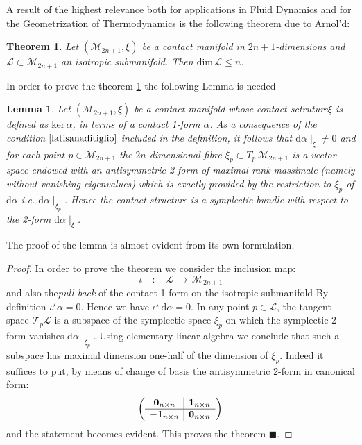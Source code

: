 \documentclass[10pt,a4paper]{article}
\newtheorem{teorema}{Theorem}[section]
\newtheorem{lemma}{Lemma}[section]
\newtheorem{proof}{Proof}[section]
\begin{document}
A result of the highest relevance both for applications in Fluid Dynamics and for the Geometrization of Thermodynamics
is the following theorem due to  Arnol'd:
\begin{teorema}
\label{barbagianni} Let $\left(\mathcal{M}_{2n+1},\xi\right)$ be
a contact manifold  in $2n+1$-dimensions and
$\mathcal{L}\subset\mathcal{M}_{2n+1}$ an isotropic submanifold.
Then $\mathrm{dim}\, \mathcal{L} \leq n$.
\end{teorema}
In order to prove the theorem \ref{barbagianni} the following Lemma is needed
\begin{lemma}
Let $\left(\mathcal{M}_{2n+1},\xi\right)$  be a contact manifold whose
contact sctruture$\xi$  is defined as
$\mathrm{ker} \,\alpha$, in terms of a contact 1-form
$\alpha$. As a consequence of the condition
$\ref{latisanaditiglio}$ included in the definition, it follows that $\mathrm{d}\alpha\mid_\xi \neq 0$
and for each point $p\in \mathcal{M}_{2n+1}$  the
$2n$-dimensional fibre $\xi_p \subset T_p \,\mathcal{M}_{2n+1}$ is a vector
space endowed with an antisymmetric  2-form of maximal rank
massimale  (namely without vanishing eigenvalues) which is  exactly provided by the restriction
to $\xi_p$  of $\mathrm{d}\alpha$
\textit{i.e.} $\mathrm{d}\alpha\mid_{\xi_p}$. Hence the contact structure is
a \textit{symplectic bundle} with respect to the
2-form $\mathrm{d}\alpha\mid_\xi$.
\end{lemma}
The proof of the lemma is almost evident from its own formulation.
\begin{proof}
{\rm In order to prove the theorem we consider the inclusion map:
\begin{equation}\label{legendro}
    \iota \quad : \quad \mathcal{L} \, \longrightarrow \, \mathcal{M}_{2n+1}
\end{equation}
and also the\textit{pull-back} of the  contact 1-form on the isotropic submanifold
 By definition
$\iota^\star\alpha = 0$. Hence we have $\iota^\star
\,\mathrm{d}\alpha = 0$. In any point $p\in \mathcal{L}$, the tangent space
 $\mathcal{T}_p \mathcal{L}$ is a subspace of the symplectic space
  $\xi_p$ on which the symplectic  2-form  vanishes $\mathrm{d}\alpha\mid_{\xi_p}$. Using elementary linear algebra
we conclude that such a subspace has maximal dimension one-half of the dimension of  $\xi_p$. Indeed it suffices to put, by means of change of basis the antisymmetric 2-form in canonical form:
\begin{equation}
    \left(\begin{array}{c|c}
    \mathbf{0}_{n\times n}& \mathbf{1}_{n\times n}\\
    \hline
    -\mathbf{1}_{n\times n} &\mathbf{0}_{n\times n} \\
    \end{array}\right)\nonumber\\
\end{equation}
and the statement becomes evident. This proves the theorem
 $\blacksquare$.}
\end{proof}
\end{document}
